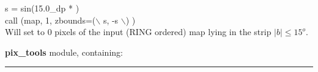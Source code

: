 \newpage
\begin{example}
{
s = sin(15.0\_dp * ) \\
call \thedocid (map, 1, zbounds=($\backslash$ s, -s $\backslash$) )  \\
}
{
Will set to 0 pixels of the input (RING ordered) map lying in the strip $|b| \le 15^o$.
}
\end{example}

\begin{modules}
  \begin{sulist}{} %
  \item[\textbf{pix\_tools}] module, containing:
  \end{sulist}
\end{modules}


\rule{\hsize}{2mm}

\newpage
